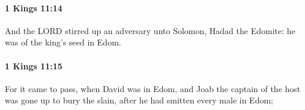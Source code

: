 		\paragraph{1 Kings 11:14} %
			\label{1KINGS-11-14}

			And the LORD stirred up an adversary unto Solomon, Hadad the Edomite: he was of the king’s seed in Edom.


		\paragraph{1 Kings 11:15} %
			\label{1KINGS-11-15}

			For it came to pass, when David was in Edom, and Joab the captain of the host was gone up to bury the slain, after he had smitten every male in Edom;


